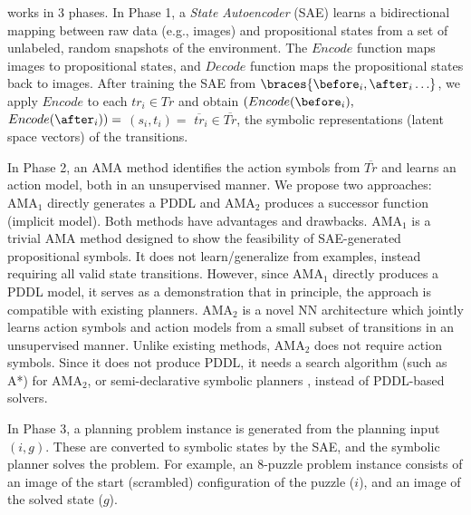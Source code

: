 \documentclass[11pt]{article}
\begin{document}

\latentplanner works in 3 phases.
In Phase 1, a \emph{State Autoencoder} (SAE) learns a bidirectional mapping between raw data (e.g., images)
 and propositional states from a set of unlabeled, random snapshots of the environment.
The $Encode$ function maps images to propositional states, and $Decode$ function maps the propositional states back to images.
After training the SAE from $\braces{\before_i, \after_i\ldots}$,
we apply $Encode$ to each $tr_i \in Tr$ and obtain $(Encode(\before_i),$ $Encode(\after_i))=$ $(s_i,t_i)=$ $\overline{tr}_i\in \overline{Tr}$,
the symbolic representations (latent space vectors) of the transitions.



In Phase 2, an AMA method identifies the action symbols from $\overline{Tr}$ and learns an action model, both in an unsupervised manner.
We propose two approaches: AMA$_1$ directly generates a PDDL and AMA$_2$ produces a successor function (implicit model).
Both methods have advantages and drawbacks.
AMA$_1$ is a trivial AMA method designed to show the feasibility of SAE-generated propositional symbols. It does not learn/generalize from examples, instead requiring all valid state transitions. However, since AMA$_1$ directly produces a PDDL model, it serves as a demonstration that in principle, the approach is compatible with existing planners.
AMA$_2$ is a novel NN architecture which jointly learns action symbols and action models from a small subset of transitions in an unsupervised manner. Unlike existing methods, AMA$_2$ does not require action symbols. Since it does not produce PDDL, it needs a search algorithm (such as A*) for AMA$_2$, or semi-declarative symbolic planners \cite{frances2017purely}, instead of PDDL-based solvers.

In Phase 3, a planning problem instance is generated from the planning input $(i,g)$.
These are converted to symbolic states by the SAE, and the symbolic planner solves the problem.
For example, an 8-puzzle problem instance consists of an image of the start (scrambled) configuration of the puzzle ($i$), and an image of the solved state ($g$).
\end{document}
